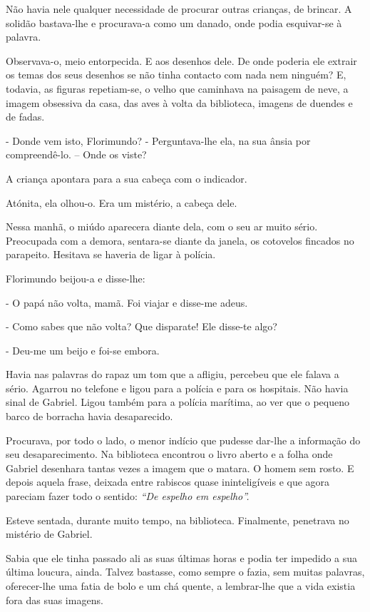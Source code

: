 Não havia nele qualquer necessidade de procurar outras crianças, de
brincar. A solidão bastava-lhe e procurava-a como um danado, onde podia
esquivar-se à palavra.

Observava-o, meio entorpecida. E aos desenhos dele. De onde poderia ele
extrair os temas dos seus desenhos se não tinha contacto com nada nem
ninguém? E, todavia, as figuras repetiam-se, o velho que caminhava na
paisagem de neve, a imagem obsessiva da casa, das aves à volta da
biblioteca, imagens de duendes e de fadas.

- Donde vem isto, Florimundo? - Perguntava-lhe ela, na sua ânsia por
compreendê-lo. -- Onde os viste?

A criança apontara para a sua cabeça com o indicador.

Atónita, ela olhou-o. Era um mistério, a cabeça dele.

Nessa manhã, o miúdo aparecera diante dela, com o seu ar muito sério.
Preocupada com a demora, sentara-se diante da janela, os cotovelos
fincados no parapeito. Hesitava se haveria de ligar à polícia.

Florimundo beijou-a e disse-lhe:

- O papá não volta, mamã. Foi viajar e disse-me adeus.

- Como sabes que não volta? Que disparate! Ele disse-te algo?

- Deu-me um beijo e foi-se embora.

Havia nas palavras do rapaz um tom que a afligiu, percebeu que ele
falava a sério. Agarrou no telefone e ligou para a polícia e para os
hospitais. Não havia sinal de Gabriel. Ligou também para a polícia
marítima, ao ver que o pequeno barco de borracha havia desaparecido.

Procurava, por todo o lado, o menor indício que pudesse dar-lhe a
informação do seu desaparecimento. Na biblioteca encontrou o livro
aberto e a folha onde Gabriel desenhara tantas vezes a imagem que o
matara. O homem sem rosto. E depois aquela frase, deixada entre rabiscos
quase ininteligíveis e que agora pareciam fazer todo o sentido:
\emph{``De espelho em espelho''.}

Esteve sentada, durante muito tempo, na biblioteca. Finalmente,
penetrava no mistério de Gabriel.

Sabia que ele tinha passado ali as suas últimas horas e podia ter
impedido a sua última loucura, ainda. Talvez bastasse, como sempre o
fazia, sem muitas palavras, oferecer-lhe uma fatia de bolo e um chá
quente, a lembrar-lhe que a vida existia fora das suas imagens.

